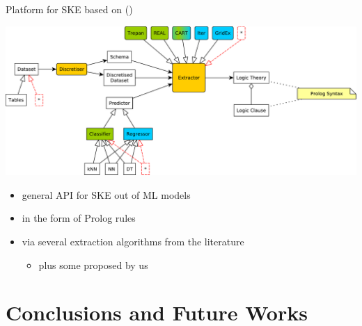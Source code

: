 \documentclass[presentation]{beamer}\mode<presentation>{\usetheme{AMSBolognaFC}}
\begin{document}
\begin{frame}{Platform for SKE based on \twopkt{} (\psyke{})}
    \begin{center}
        \includegraphics[width=.8\linewidth]{figures/Psyke.pdf}
    \end{center}
    \vfill
    \begin{itemize}
        \item general \alert{API} for \alert{SKE} out of ML models
        \vfill
        \item in the form of \alert{Prolog rules}
        \vfill
        \item via several extraction algorithms from the literature
        \begin{itemize}
            \item plus some proposed by us
        \end{itemize}
    \end{itemize}
\end{frame}

\section{Conclusions and Future Works}
\end{document}
